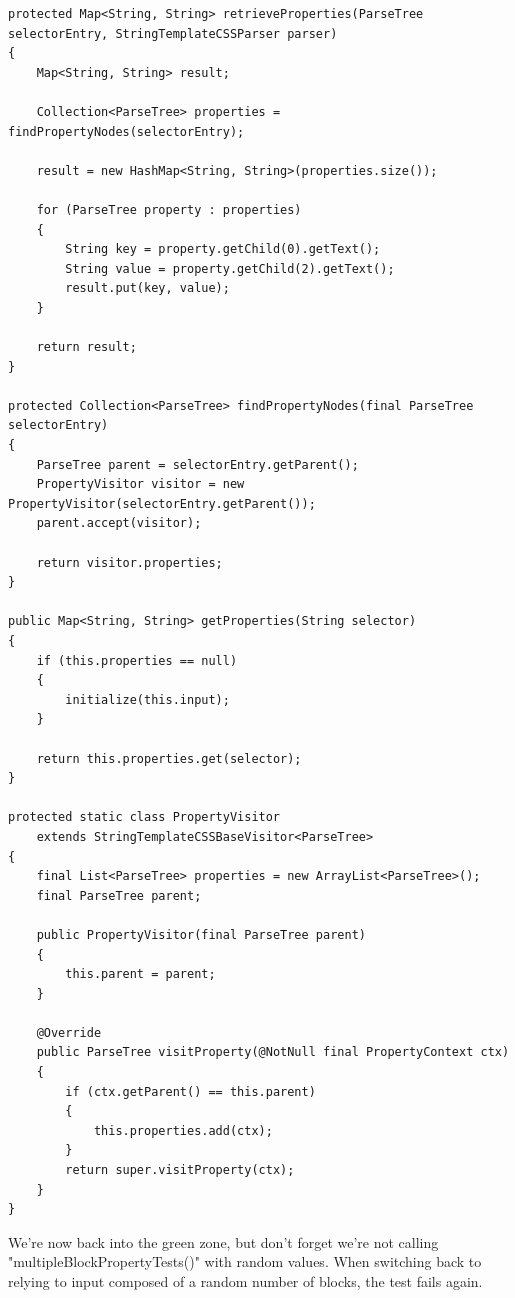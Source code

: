 \documentclass[11pt]{article}
\begin{document}
\begin{verbatim}
protected Map<String, String> retrieveProperties(ParseTree selectorEntry, StringTemplateCSSParser parser)
{
    Map<String, String> result;

    Collection<ParseTree> properties = findPropertyNodes(selectorEntry);

    result = new HashMap<String, String>(properties.size());

    for (ParseTree property : properties)
    {
        String key = property.getChild(0).getText();
        String value = property.getChild(2).getText();
        result.put(key, value);
    }

    return result;
}

protected Collection<ParseTree> findPropertyNodes(final ParseTree selectorEntry)
{
    ParseTree parent = selectorEntry.getParent();
    PropertyVisitor visitor = new PropertyVisitor(selectorEntry.getParent());
    parent.accept(visitor);

    return visitor.properties;
}

public Map<String, String> getProperties(String selector)
{
    if (this.properties == null)
    {
        initialize(this.input);
    }

    return this.properties.get(selector);
}

protected static class PropertyVisitor
    extends StringTemplateCSSBaseVisitor<ParseTree>
{
    final List<ParseTree> properties = new ArrayList<ParseTree>();
    final ParseTree parent;

    public PropertyVisitor(final ParseTree parent)
    {
        this.parent = parent;
    }

    @Override
    public ParseTree visitProperty(@NotNull final PropertyContext ctx)
    {
        if (ctx.getParent() == this.parent)
        {
            this.properties.add(ctx);
        }
        return super.visitProperty(ctx);
    }
}
\end{verbatim}

We're now back into the green zone, but don't forget we're not calling "multipleBlockPropertyTests()" with random values. When
switching back to relying to input composed of a random number of blocks, the test fails again.
\end{document}
